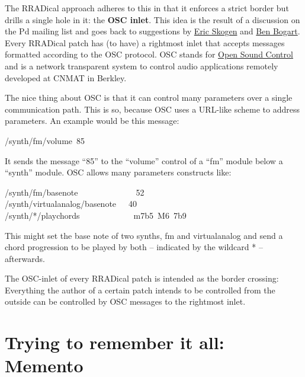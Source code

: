 \documentclass[10pt,english]{scrartcl}
\begin{document}
The RRADical approach adheres to this in that it enforces a strict border
but drills a single hole in it: the \textbf{OSC inlet}. This idea is the result
of a discussion on the Pd mailing list and goes back to suggestions by
\href{http://www.audionerd.com}{Eric Skogen} and \href{http://www.ekran.org/ben/}{Ben Bogart}. Every RRADical patch has (to have) a
rightmost inlet that accepts messages formatted according to the OSC
protocol. OSC stands for \href{http://www.cnmat.berkeley.edu/OpenSoundControl/}{Open Sound Control} and is a network transparent
system to control audio applications remotely developed at CNMAT in Berkley.

The nice thing about OSC is that it can control many parameters over a
single communication path. This is so, because OSC uses a URL-like scheme
to address parameters. An example would be this message:
\begin{ttfamily}\begin{flushleft}
\mbox{/synth/fm/volume~85}
\end{flushleft}\end{ttfamily}

It sends the message ``85'' to the ``volume'' control of a ``fm'' module below a
``synth'' module. OSC allows many parameters constructs like:
\begin{ttfamily}\begin{flushleft}
\mbox{/synth/fm/basenote~~~~~~~~~~~~~~52}\\
\mbox{/synth/virtualanalog/basenote~~~40}\\
\mbox{/synth/*/playchords~~~~~~~~~~~~~m7b5~M6~7b9}
\end{flushleft}\end{ttfamily}

This might set the base note of two synths, fm and virtualanalog and
send a chord progression to be played by both -- indicated by the wildcard
* -- afterwards.

The OSC-inlet of every RRADical patch is intended as the border crossing:
Everything the author of a certain patch intends to be controlled from the
outside can be controlled by OSC messages to the rightmost inlet.



\hypertarget{trying-to-remember-it-all-memento}{}
\section*{Trying to remember it all: Memento}
\end{document}
